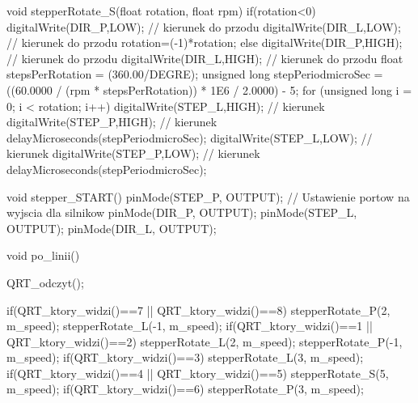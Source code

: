 void stepperRotate_S(float rotation, float rpm) {
  if(rotation<0) {
    digitalWrite(DIR_P,LOW); // kierunek do przodu
    digitalWrite(DIR_L,LOW); // kierunek do przodu
    rotation=(-1)*rotation;
  }
  else {
    digitalWrite(DIR_P,HIGH); // kierunek do przodu
    digitalWrite(DIR_L,HIGH); // kierunek do przodu
  }
  float stepsPerRotation = (360.00/DEGRE);
  unsigned long stepPeriodmicroSec = ((60.0000 / (rpm * stepsPerRotation)) * 1E6 / 2.0000) - 5;
  for (unsigned long i = 0; i < rotation; i++) {
    digitalWrite(STEP_L,HIGH); // kierunek
    digitalWrite(STEP_P,HIGH); // kierunek
    delayMicroseconds(stepPeriodmicroSec);
    digitalWrite(STEP_L,LOW); // kierunek
    digitalWrite(STEP_P,LOW); // kierunek
    delayMicroseconds(stepPeriodmicroSec);
  }
}

void stepper_START(){
  pinMode(STEP_P, OUTPUT); // Ustawienie portow na wyjscia dla silnikow
  pinMode(DIR_P, OUTPUT);
  pinMode(STEP_L, OUTPUT);
  pinMode(DIR_L, OUTPUT);
}

void po_linii() {
  QRT_odczyt();
  
  if(QRT_ktory_widzi()==7 || QRT_ktory_widzi()==8) {
    stepperRotate_P(2, m_speed);
    stepperRotate_L(-1, m_speed);
  }
  if(QRT_ktory_widzi()==1 || QRT_ktory_widzi()==2) {
    stepperRotate_L(2, m_speed);
    stepperRotate_P(-1, m_speed);
  }
  if(QRT_ktory_widzi()==3) stepperRotate_L(3, m_speed);
  if(QRT_ktory_widzi()==4 || QRT_ktory_widzi()==5) stepperRotate_S(5, m_speed);
  if(QRT_ktory_widzi()==6) stepperRotate_P(3, m_speed);
}

